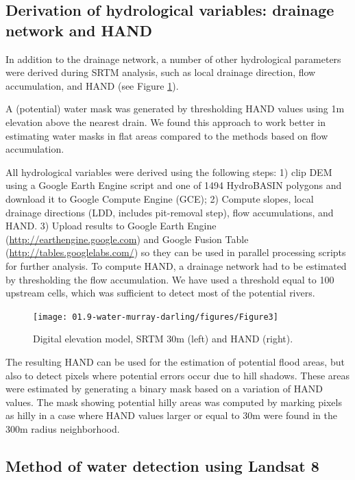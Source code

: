 \subsection{Derivation of hydrological variables: drainage network and HAND}
In addition to the drainage network, a number of other hydrological parameters were derived during \gls{SRTM} analysis, such as local drainage direction, flow accumulation, and \gls{HAND} (see Figure \ref{fig:au-dem-hand}). 

A (potential) water mask was generated by thresholding \gls{HAND} values using 1m elevation above the nearest drain. We found this approach to work better in estimating water masks in flat areas compared to the methods based on flow accumulation.

All hydrological variables were derived using the following steps: 1) clip DEM using a Google Earth Engine script and one of 1494 HydroBASIN polygons and download it to Google Compute Engine (GCE); 2) Compute slopes, local drainage directions (LDD, includes pit-removal step), flow accumulations, and \gls{HAND}. 3) Upload results to Google Earth Engine (\url{http://earthengine.google.com}) and Google Fusion Table (\url{http://tables.googlelabs.com/}) so they can be used in parallel processing scripts for further analysis. To compute \gls{HAND}, a drainage network had to be estimated by thresholding the flow accumulation. We have used a threshold equal to 100 upstream cells, which was sufficient to detect most of the potential rivers. 

\begin{figure}
	\centering
	\texttt{[image: 01.9-water-murray-darling/figures/Figure3]}
	\caption{Digital elevation model, \gls{SRTM} 30m (left) and \gls{HAND} (right).}
	\label{fig:au-dem-hand}
\end{figure}

The resulting \gls{HAND} can be used for the estimation of potential flood areas, but also to detect pixels where potential errors occur due to hill shadows. These areas were estimated by generating a binary mask based on a variation of \gls{HAND} values. The mask showing potential hilly areas was computed by marking pixels as hilly in a case where \gls{HAND} values larger or equal to 30m were found in the 300m radius neighborhood.

\subsection{Method of water detection using Landsat 8}

